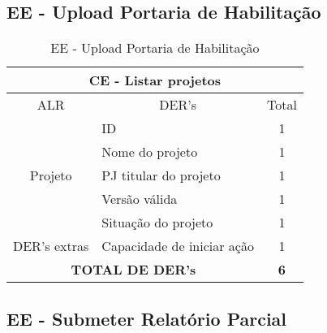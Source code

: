   \subsection{EE - Upload Portaria de Habilitação}
\begin{table}[!h]
\centering
\caption{EE - Upload Portaria de Habilitação}
\label{ee_upload_portaria_de_habilitacao}
\begin{tabular}{|c|l|c|}
\hline
\multicolumn{3}{|c|}{CE - Listar projetos}                    \\ \hline
ALR                      & \multicolumn{1}{c|}{DER's} & Total \\ \hline
\multirow{5}{*}{Projeto} & ID                         & 1     \\ \cline{2-3} 
                         & Nome do projeto            & 1     \\ \cline{2-3} 
                         & PJ titular do projeto      & 1     \\ \cline{2-3} 
                         & Versão válida              & 1     \\ \cline{2-3} 
                         & Situação do projeto        & 1     \\ \hline
DER's extras                & Capacidade de iniciar ação & 1     \\ \hline
\multicolumn{2}{|c|}{\textbf{TOTAL DE DER's}}                  & \textbf{6}     \\ \hline
\end{tabular}
\end{table}
  \subsection{EE - Submeter Relatório Parcial}

